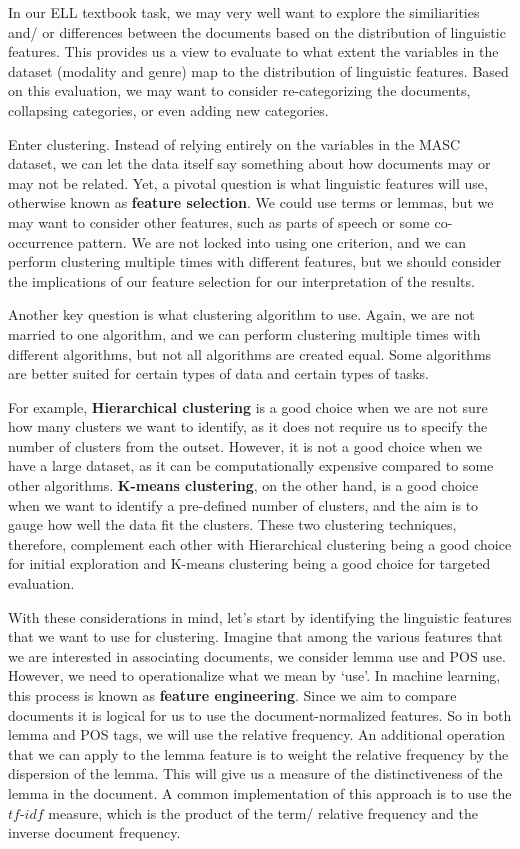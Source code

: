 \documentclass[
  letterpaper,
  DIV=11,
  numbers=noendperiod]{scrreprt}
\theoremstyle{definition}
\theoremstyle{remark}
\begin{document}
In our ELL textbook task, we may very well want to explore the
similiarities and/ or differences between the documents based on the
distribution of linguistic features. This provides us a view to evaluate
to what extent the variables in the dataset (modality and genre) map to
the distribution of linguistic features. Based on this evaluation, we
may want to consider re-categorizing the documents, collapsing
categories, or even adding new categories.

Enter clustering. Instead of relying entirely on the variables in the
MASC dataset, we can let the data itself say something about how
documents may or may not be related. Yet, a pivotal question is what
linguistic features will use, otherwise known as \textbf{feature
selection}. We could use terms or lemmas, but we may want to consider
other features, such as parts of speech or some co-occurrence pattern.
We are not locked into using one criterion, and we can perform
clustering multiple times with different features, but we should
consider the implications of our feature selection for our
interpretation of the results.

Another key question is what clustering algorithm to use. Again, we are
not married to one algorithm, and we can perform clustering multiple
times with different algorithms, but not all algorithms are created
equal. Some algorithms are better suited for certain types of data and
certain types of tasks.

For example, \textbf{Hierarchical clustering} is a good choice when we
are not sure how many clusters we want to identify, as it does not
require us to specify the number of clusters from the outset. However,
it is not a good choice when we have a large dataset, as it can be
computationally expensive compared to some other algorithms.
\textbf{K-means clustering}, on the other hand, is a good choice when we
want to identify a pre-defined number of clusters, and the aim is to
gauge how well the data fit the clusters. These two clustering
techniques, therefore, complement each other with Hierarchical
clustering being a good choice for initial exploration and K-means
clustering being a good choice for targeted evaluation.

With these considerations in mind, let's start by identifying the
linguistic features that we want to use for clustering. Imagine that
among the various features that we are interested in associating
documents, we consider lemma use and POS use. However, we need to
operationalize what we mean by `use'. In machine learning, this process
is known as \textbf{feature engineering}. Since we aim to compare
documents it is logical for us to use the document-normalized features.
So in both lemma and POS tags, we will use the relative frequency. An
additional operation that we can apply to the lemma feature is to weight
the relative frequency by the dispersion of the lemma. This will give us
a measure of the distinctiveness of the lemma in the document. A common
implementation of this approach is to use the \(tf\)-\(idf\) measure,
which is the product of the term/ relative frequency and the inverse
document frequency.
\end{document}
